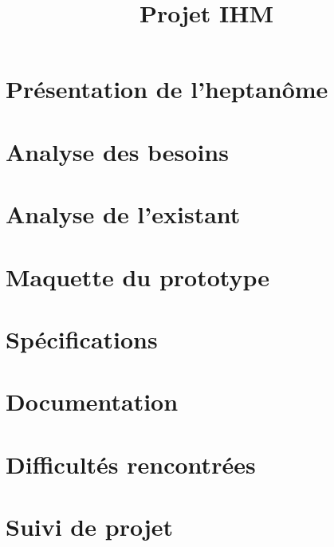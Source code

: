 \documentclass[a4paper]{TPInsa}
\title{Projet IHM}
\begin{document}
	\pageTitre
	\tableMatieres
	
	\section{Présentation de l'heptanôme}
		
	
	\section{Analyse des besoins} %
		
	
	\section{Analyse de l'existant}	
		
	
	\section{Maquette du prototype}
		
			
	\section{Spécifications}
		
			
	\section{Documentation}
		
			
	\section{Difficultés rencontrées}
		
			
	\section{Suivi de projet}
		
				
	
\end{document}
